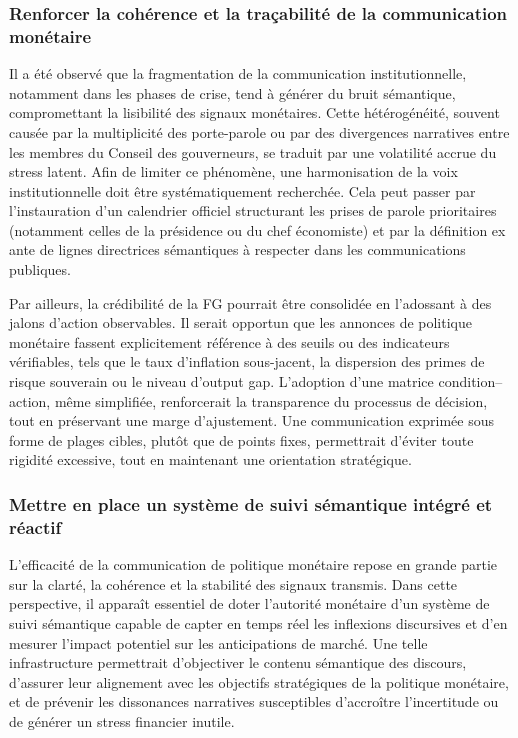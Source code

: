 \subsubsection{Renforcer la cohérence et la traçabilité de la communication monétaire}

Il a été observé que la fragmentation de la communication institutionnelle, notamment dans les phases de crise, tend à générer du bruit sémantique, compromettant la lisibilité des signaux monétaires. Cette hétérogénéité, souvent causée par la multiplicité des porte-parole ou par des divergences narratives entre les membres du Conseil des gouverneurs, se traduit par une volatilité accrue du stress latent. Afin de limiter ce phénomène, une harmonisation de la voix institutionnelle doit être systématiquement recherchée. Cela peut passer par l’instauration d’un calendrier officiel structurant les prises de parole prioritaires (notamment celles de la présidence ou du chef économiste) et par la définition ex ante de lignes directrices sémantiques à respecter dans les communications publiques.

Par ailleurs, la crédibilité de la FG pourrait être consolidée en l’adossant à des jalons d’action observables. Il serait opportun que les annonces de politique monétaire fassent explicitement référence à des seuils ou des indicateurs vérifiables, tels que le taux d’inflation sous-jacent, la dispersion des primes de risque souverain ou le niveau d’output gap. L’adoption d’une matrice condition–action, même simplifiée, renforcerait la transparence du processus de décision, tout en préservant une marge d’ajustement. Une communication exprimée sous forme de plages cibles, plutôt que de points fixes, permettrait d’éviter toute rigidité excessive, tout en maintenant une orientation stratégique.

\subsubsection{Mettre en place un système de suivi sémantique intégré et réactif}

L’efficacité de la communication de politique monétaire repose en grande partie sur la clarté, la cohérence et la stabilité des signaux transmis. Dans cette perspective, il apparaît essentiel de doter l’autorité monétaire d’un système de suivi sémantique capable de capter en temps réel les inflexions discursives et d’en mesurer l’impact potentiel sur les anticipations de marché. Une telle infrastructure permettrait d’objectiver le contenu sémantique des discours, d’assurer leur alignement avec les objectifs stratégiques de la politique monétaire, et de prévenir les dissonances narratives susceptibles d’accroître l’incertitude ou de générer un stress financier inutile.\\

